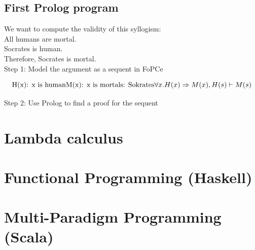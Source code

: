 \subsection{First Prolog program}
We want to compute the validity of this syllogism: \\
All humans are mortal. \\
Socrates is human. \\
Therefore, Socrates is mortal.\\
Step 1: Model the argument as a sequent in FoPCe

\[
\text{H(x): x is human}\\
\text{M(x): x is mortal}\\
\text{s: Sokrates}\\
\forall x.H(x) \Rightarrow M(x),H(s) \vdash M(s)
\]

Step 2: Use Prolog to find a proof for the sequent


\section{Lambda calculus}

\section{Functional Programming (Haskell)}

\section{Multi-Paradigm Programming (Scala)}



